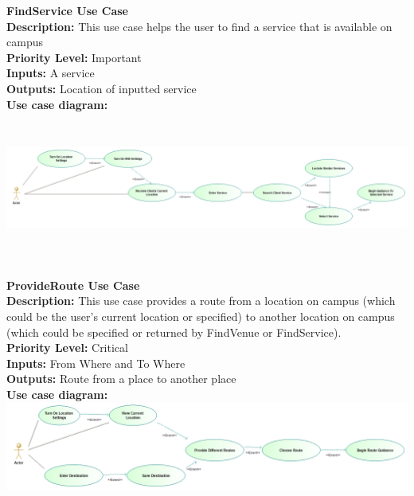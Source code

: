 \documentclass[a4paper,12pt]{article}
\begin{document}
\textbf{\large FindService Use Case}\\
\textbf{Description: } This use case helps the user to find a service that is available on campus\\
\textbf{Priority Level:} Important\\
\textbf{Inputs:} A service\\
\textbf{Outputs:} Location of inputted service\\
\textbf{Use case diagram: }\\
\includegraphics[scale=1, width=\textwidth, height=5cm]{images/find_service.png}

\textbf{\large ProvideRoute Use Case}\\
\textbf{Description: } This use case provides a route from a location on campus (which could be the user's current location or specified) to another location on campus (which could be specified or returned by FindVenue or FindService).\\
\textbf{Priority Level: } Critical\\
\textbf{Inputs:} From Where and To Where\\
\textbf{Outputs:} Route from a place to another place\\
\textbf{Use case diagram: }\\
\includegraphics[width=\textwidth]{images/provide_route.png}
\end{document}
